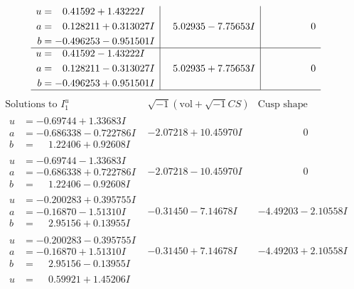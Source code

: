 \documentclass[1p]{elsarticle_modified}
\theoremstyle{definition}
\newcommand{\I}{\sqrt{-1}}
\begin{document}
$$\begin{array}{c|c|c}
\begin{aligned}
u &= \phantom{-}0.41592 + 1.43222 I \\
a &= \phantom{-}0.128211 + 0.313027 I \\
b &= -0.496253 - 0.951501 I\end{aligned}
 & \phantom{-}5.02935 - 7.75653 I & \phantom{-0.000000 } 0 \\ \hline\begin{aligned}
u &= \phantom{-}0.41592 - 1.43222 I \\
a &= \phantom{-}0.128211 - 0.313027 I \\
b &= -0.496253 + 0.951501 I\end{aligned}
 & \phantom{-}5.02935 + 7.75653 I & \phantom{-0.000000 } 0\\
 \hline 
 \end{array}$$\newpage$$\begin{array}{c|c|c}  
\text{Solutions to }I^u_{1}& \I (\text{vol} + \sqrt{-1}CS) & \text{Cusp shape}\\
 \hline 
\begin{aligned}
u &= -0.69744 + 1.33683 I \\
a &= -0.686338 - 0.722786 I \\
b &= \phantom{-}1.22406 + 0.92608 I\end{aligned}
 & -2.07218 + 10.45970 I & \phantom{-0.000000 } 0 \\ \hline\begin{aligned}
u &= -0.69744 - 1.33683 I \\
a &= -0.686338 + 0.722786 I \\
b &= \phantom{-}1.22406 - 0.92608 I\end{aligned}
 & -2.07218 - 10.45970 I & \phantom{-0.000000 } 0 \\ \hline\begin{aligned}
u &= -0.200283 + 0.395755 I \\
a &= -0.16870 - 1.51310 I \\
b &= \phantom{-}2.95156 + 0.13955 I\end{aligned}
 & -0.31450 - 7.14678 I & -4.49203 - 2.10558 I \\ \hline\begin{aligned}
u &= -0.200283 - 0.395755 I \\
a &= -0.16870 + 1.51310 I \\
b &= \phantom{-}2.95156 - 0.13955 I\end{aligned}
 & -0.31450 + 7.14678 I & -4.49203 + 2.10558 I \\ \hline\begin{aligned}
u &= \phantom{-}0.59921 + 1.45206 I \\

\end{aligned}
\end{array}$$
\end{document}

